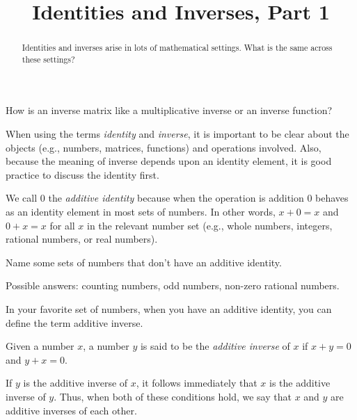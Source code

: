 \documentclass[space,handout,nooutcomes]{ximera}
\title{Identities and Inverses, Part 1}
\begin{document}
\begin{abstract}
Identities and inverses arise in lots of mathematical
settings.  What is the same across these settings?  
\end{abstract}
\maketitle


How is an inverse matrix like a multiplicative inverse or an inverse function?  

When using the terms \emph{identity} and \emph{inverse}, it is
important to be clear about the objects (e.g., numbers, matrices,
functions) and operations involved.  Also, because the meaning of
inverse depends upon an identity element, it is good practice to
discuss the identity first.

\begin{definition}
We call $0$ the \emph{additive identity} because when the operation is addition 
$0$ behaves as an identity element in most sets of numbers.  
In other words, $x+0=x$ and $0+x=x$ for all $x$ in the relevant number
set (e.g., whole numbers, integers, rational numbers, or real
numbers).
\end{definition}

\begin{question}
Name some sets of numbers that don't have an additive identity.
\begin{freeResponse}
\begin{hint}
Possible answers: counting numbers, odd numbers, non-zero rational
numbers.
\end{hint}
\end{freeResponse}
\end{question}

In your favorite set of numbers, when you have an additive identity,
you can define the term additive inverse.  

\begin{definition}
Given a number $x$, a number $y$ is said to be the \emph{additive
  inverse} of $x$ if $x+y=0$ and $y+x=0$.  
\end{definition}

If $y$ is the additive inverse of $x$, it follows immediately that
$x$ is the additive inverse of $y$.  Thus, when both of these
conditions hold, we say that $x$ and $y$ are additive inverses of each
other.
\end{document}
